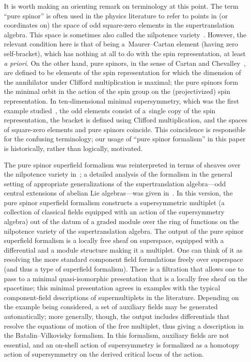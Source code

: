 \documentclass[pdftex]{sigma}
\numberwithin{equation}{section}
\begin{document}
\begin{rmk}
	It is worth making an orienting remark on terminology at this point. The term ``pure spinor'' is often used in the physics literature to refer to points in (or coordinates on) the space of odd square-zero elements in the supertranslation algebra. This space is sometimes also called the nilpotence variety~\cite{NV}. However, the relevant condition here is that of being a~Maurer--Cartan element (having zero self-bracket), which has nothing at all to do with the spin representation, at least \emph{a priori}.
	On the other hand, pure spinors, in the sense of Cartan and Chevalley~\cite{ChevalleySpinor}, are defined to be elements of the spin representation for which the dimension of the annihilator under Clifford multiplication is maximal; the pure spinors form the minimal orbit in the action of the spin group on the (projectivized) spin representation.
	In ten-dimensional minimal supersymmetry, which was the first example studied~\cite{Nilsson}, the odd elements consist of a~single copy of the spin representation, the bracket is defined using Clifford multiplication, and the spaces of square-zero elements and pure spinors coincide. This coincidence is responsible for the confusing terminology; our usage of ``pure spinor formalism'' in this paper is historically, rather than logically, motivated.
\end{rmk}

The pure spinor superfield formalism was reinterpreted in terms of sheaves over the nilpotence variety in~\cite{NV}; a detailed analysis of the formalism in the general setting of appropriate generalizations of the supertranslation algebra---odd central extensions of abelian Lie algebras---was given in~\cite{perspectives}. In this version, the pure spinor superfield formalism constructs a supersymmetric multiplet (a collection of classical fields equipped with an action of the supersymmetry algebra) out of the datum of a graded module over the ring of functions on the nilpotence variety of the supertranslation algebra.
The output of the pure spinor superfield formalism is a locally free sheaf on superspace, equipped with a differential and a module structure making it a multiplet. One can think of it as resolving the more standard component field formulations freely over superspace (and thus a type of superfield formalism). There is a filtration that allows one to pass to a minimal quasi-isomorphic presentation that is a locally free sheaf on the spacetime; this minimal presentation agrees in examples with the typical component-field descriptions of supermultiplets in the literature.
Depending on the example being considered, a set of auxiliary fields may be generated automatically; more generally, though, the output includes differentials that resolve the equations of motion of the free multiplet, thus giving a description in the Batalin--Vilkovisky formalism. In this formalism, auxiliary fields are not essential, and an on-shell action of supersymmetry is formalized as a homotopy action of supersymmetry on the derived critical locus of the action.
\end{document}
